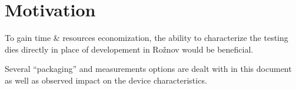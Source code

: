 \section{Motivation} \label{sec:motivation}

To gain time \& resources economization, the ability to characterize the testing dies directly in place of developement in Rožnov would be beneficial.

Several ``packaging'' and measurements options are dealt with in this document as well as observed impact on the device characteristics.
